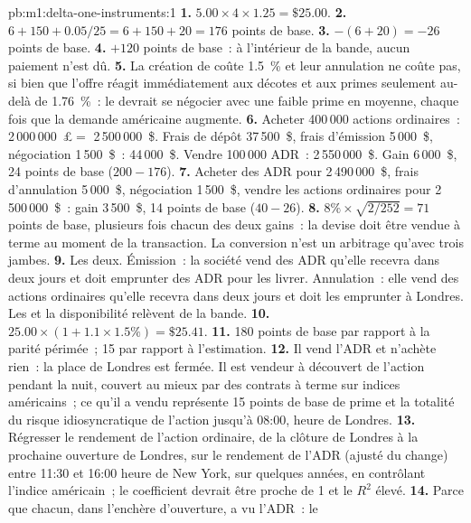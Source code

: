 \begin{solution}{pb:m1:delta-one-instruments:1}
\textbf{1.} $5.00 \times 4 \times 1.25 = \$25.00$.
\textbf{2.} $6 + 150 + 0.05/25 = 6 + 150 + 20 = 176$ points de base.
\textbf{3.} $-(6 + 20) = -26$ points de base.
\textbf{4.} $+120$ points de base~: à l'intérieur de la bande, aucun paiement n'est dû.
\textbf{5.} La création de  coûte 1.5~\% et leur annulation ne coûte pas, si bien que
l'offre réagit immédiatement aux décotes et aux primes seulement au-delà de 1.76~\%~: le
 devrait se négocier avec une faible prime en moyenne, chaque fois que la demande
américaine augmente.
\textbf{6.} Acheter 400\,000 actions ordinaires~: 2\,000\,000~\pounds $=$ 2\,500\,000~\$.
Frais de dépôt 37\,500~\$, frais d'émission 5\,000~\$, négociation 1\,500~\$~: 44\,000~\$. Vendre
100\,000 ADR~: 2\,550\,000~\$. Gain 6\,000~\$, 24 points de base ($200 - 176$).
\textbf{7.} Acheter des ADR pour 2\,490\,000~\$, frais d'annulation 5\,000~\$, négociation 1\,500~\$, vendre
les actions ordinaires pour 2\,500\,000~\$~: gain 3\,500~\$, 14 points de base ($40 - 26$).
\textbf{8.} $8\% \times \sqrt{2/252} = 71$ points de base, plusieurs fois chacun des
deux gains~: la devise doit être vendue à terme au moment de la transaction. La
conversion n'est un arbitrage qu'avec trois jambes.
\textbf{9.} Les deux. Émission~: la société vend des ADR qu'elle recevra dans deux jours
et doit emprunter des ADR pour les livrer. Annulation~: elle vend des actions ordinaires
qu'elle recevra dans deux jours et doit les emprunter à Londres. Les  et la disponibilité relèvent de la bande.
\textbf{10.} $25.00 \times (1 + 1.1 \times 1.5\%) = \$25.41$.
\textbf{11.} 180 points de base par rapport à la parité périmée~; 15 par rapport à l'estimation.
\textbf{12.} Il vend l'ADR et n'achète rien~: la place de Londres est fermée. Il est
vendeur à découvert de l'action pendant la nuit, couvert au mieux par des contrats à terme sur indices américains~; ce qu'il a vendu
représente 15 points de base de prime et la totalité du risque
idiosyncratique de l'action jusqu'à 08:00, heure de Londres.
\textbf{13.} Régresser le rendement de l'action ordinaire, de la clôture de Londres à la
prochaine ouverture de Londres, sur le rendement de l'ADR (ajusté du change) entre 11:30 et 16:00
heure de New York, sur quelques années, en contrôlant l'indice américain~; le coefficient
devrait être proche de 1 et le $R^2$ élevé.
\textbf{14.} Parce que chacun, dans l'enchère d'ouverture, a vu l'ADR~: le

\end{solution}
